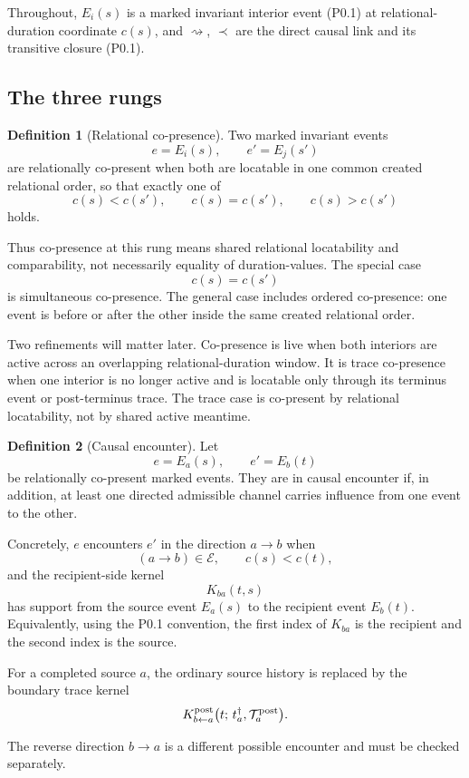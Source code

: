 \documentclass[11pt,a4paper]{article}
\def\mathfrak#1{#1}%
\def\emph#1{#1}%
\theoremstyle{definition}
\newtheorem{definition}{Definition}[section]
\theoremstyle{plain}
\theoremstyle{remark}
\begin{document}
Throughout, \(E_i(s)\) is a marked invariant interior event (P0.1) at relational-duration
coordinate \(\mathfrak c(s)\), and \(\rightsquigarrow\), \(\prec\) are the direct causal
link and its transitive closure (P0.1).

\subsection{The three rungs}

\begin{definition}[Relational co-presence]\label{def:copres}
Two marked invariant events
\[
e=E_i(s),
\qquad
e'=E_j(s')
\]
are \emph{relationally co-present} when both are locatable in one common created
relational order, so that exactly one of
\[
\mathfrak c(s)<\mathfrak c(s'),
\qquad
\mathfrak c(s)=\mathfrak c(s'),
\qquad
\mathfrak c(s)>\mathfrak c(s')
\]
holds.

Thus co-presence at this rung means shared relational locatability and
comparability, not necessarily equality of duration-values. The special case
\[
\mathfrak c(s)=\mathfrak c(s')
\]
is \emph{simultaneous co-presence}. The general case includes ordered
co-presence: one event is before or after the other inside the same created
relational order.
\end{definition}

\noindent Two refinements will matter later. Co-presence is \emph{live} when both
interiors are active across an overlapping relational-duration window. It is \emph{trace}
co-presence when one interior is no longer active and is locatable only through its
terminus event or post-terminus trace. The trace case is co-present by relational
locatability, not by shared active meantime.

\begin{definition}[Causal encounter]\label{def:causenc}
Let
\[
e=E_a(s),
\qquad
e'=E_b(t)
\]
be relationally co-present marked events. They are in \emph{causal encounter} if,
in addition, at least one directed admissible channel carries influence from one
event to the other.

Concretely, \(e\) encounters \(e'\) in the direction \(a\to b\) when
\[
(a\to b)\in\mathcal E,
\qquad
\mathfrak c(s)<\mathfrak c(t),
\]
and the recipient-side kernel
\[
K_{ba}(t,s)
\]
has support from the source event \(E_a(s)\) to the recipient event \(E_b(t)\).
Equivalently, using the P0.1 convention, the first index of \(K_{ba}\) is the
recipient and the second index is the source.

For a completed source \(a\), the ordinary source history is replaced by the
boundary trace kernel
\[
K^{\rm post}_{b\leftarrow a}
\bigl(t;\,t_a^\dagger,\mathcal T_a^{\rm post}\bigr).
\]

The reverse direction \(b\to a\) is a different possible encounter and must be
checked separately.
\end{definition}
\end{document}

